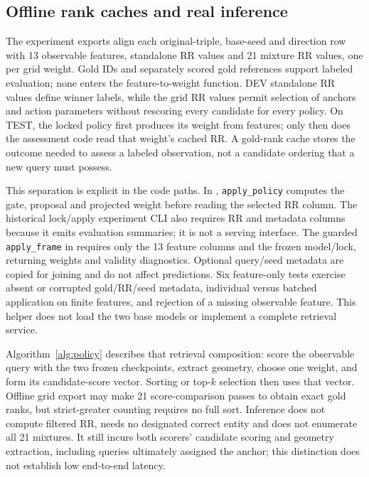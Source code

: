 \documentclass[11pt,a4paper]{article}
\begin{document}
\subsection{Offline rank caches and real inference}
\label{app:inference-cache}
The experiment exports align each original-triple, base-seed and direction row with 13 observable features, standalone RR values and 21 mixture RR values, one per grid weight. Gold IDs and separately scored gold references support labeled evaluation; none enters the feature-to-weight function. DEV standalone RR values define winner labels, while the grid RR values permit selection of anchors and action parameters without rescoring every candidate for every policy. On TEST, the locked policy first produces its weight from features; only then does the assessment code read that weight's cached RR. A gold-rank cache stores the outcome needed to assess a labeled observation, not a candidate ordering that a new query must possess.

This separation is explicit in the code paths. In , \texttt{apply\_policy} computes the gate, proposal and projected weight before reading the selected RR column. The historical lock/apply experiment CLI also requires RR and metadata columns because it emits evaluation summaries; it is not a serving interface. The guarded \texttt{apply\_frame} in  requires only the 13 feature columns and the frozen model/lock, returning weights and validity diagnostics. Optional query/seed metadata are copied for joining and do not affect predictions. Six feature-only tests exercise absent or corrupted gold/RR/seed metadata, individual versus batched application on finite features, and rejection of a missing observable feature. This helper does not load the two base models or implement a complete retrieval service.

Algorithm~\ref{alg:policy} describes that retrieval composition: score the observable query with the two frozen checkpoints, extract geometry, choose one weight, and form its candidate-score vector. Sorting or top-$k$ selection then uses that vector. Offline grid export may make 21 score-comparison passes to obtain exact gold ranks, but strict-greater counting requires no full sort. Inference does not compute filtered RR, needs no designated correct entity and does not enumerate all 21 mixtures. It still incurs both scorers' candidate scoring and geometry extraction, including queries ultimately assigned the anchor; this distinction does not establish low end-to-end latency.
\end{document}
